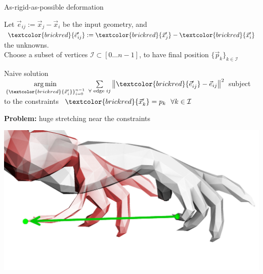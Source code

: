 \documentclass[UKenglish,aspectratio=169]{beamer}
\DeclareMathOperator*{\argmin}{arg\,min}
\newcommand\unknown[1]{\textcolor{brickred}{#1}}
\begin{document}
\begin{frame}{As-rigid-as-possible deformation}
\pause

Let $\vec{e}_{ij}:=\vec{x}_j - \vec{x}_i$ be the input geometry, and $\unknown{\vec{e}_{ij}'}:=\unknown{\vec{x}_j'} - \unknown{\vec{x}_i'}$ the unknowns.\\
Choose a subset of vertices $\mathcal I\subset [0\dots n-1]$, to have final position $\{\vec{p}_k\}_{k\in\mathcal I}$
\pause
\begin{block}{Naive solution}
$\argmin\limits_{\{\unknown{\vec{x}'_i}\}_{i=0}^{n-1}} ~\sum\limits_{\forall \text{~edge~} ij}\left\|\unknown{\vec{e}_{ij}'} - \vec{e}_{ij}\right\|^2$
subject to the constraints~ $\unknown{\vec{x}_k'} = p_k ~~ \forall k\in\mathcal I$
\end{block}

\pause
\textbf{Problem:} huge stretching near the constraints
\centerline{\includegraphics[width=0.45\linewidth]{../manuscript/img/arap-lap-a.jpg}}

\end{frame}
\end{document}

